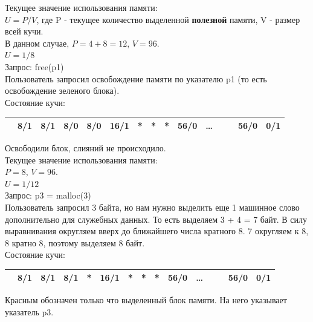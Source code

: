 \documentclass[12pt, letterpaper]{article}
\begin{document}
Текущее значение использования памяти:\\
$U=P/V$, где P - текущее количество выделенной \textbf{полезной} памяти, V - размер всей кучи.\\
В данном случае, $P=4 + 8 = 12$, $V=96$.\\ 
$U=1/8$\\

Запрос: free(p1)\\
Пользователь запросил освобождение памяти по указателю p1 (то есть освобождение зеленого блока).\\

Состояние кучи:
\begin{center}
    \begin{tabular}{|c|c|c|c|c|c|c|c|c|c|c|c|c|c|c|}
        \hline
         \cellcolor{black} & \cellcolor[gray]{0.9} 8/1 & \cellcolor[gray]{0.9} 8/1 &8/0 &8/0 &\cellcolor{blue!=40} 16/1 & \cellcolor{blue!=40}*& \cellcolor{blue!=40}*& \cellcolor{blue!=40}*&56/0& \dots & & & 56/0 & 0/1 \\
        \hline
    \end{tabular}
\end{center}
Освободили блок, слияний не происходило.\\

Текущее значение использования памяти:\\
$P=8$, $V=96$.\\ 
$U=1/12$\\

Запрос: p3 = malloc(3)\\
Пользователь запросил 3 байта, но нам нужно выделить еще 1 машинное слово дополнительно для служебных данных. То есть выделяем 3 + 4 = 7 байт. В силу выравнивания округляем вверх до ближайшего числа кратного 8. 7 округляем к 8, 8 кратно 8, поэтому выделяем 8 байт.\\
Состояние кучи:
\begin{center}
    \begin{tabular}{|c|c|c|c|c|c|c|c|c|c|c|c|c|c|c|}
        \hline
         \cellcolor{black} & \cellcolor[gray]{0.9} 8/1 & \cellcolor[gray]{0.9} 8/1 &\cellcolor{red!=40}8/1 &\cellcolor{red!=40}*&\cellcolor{blue!=40} 16/1 & \cellcolor{blue!=40}*& \cellcolor{blue!=40}*& \cellcolor{blue!=40}*&56/0& \dots & & & 56/0 & 0/1 \\
        \hline
    \end{tabular}
\end{center}
Красным обозначен только что выделенный блок памяти. На него указывает указатель p3.\\
\end{document}
